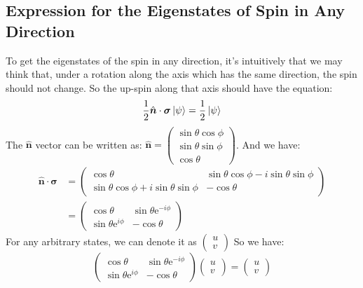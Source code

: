 \documentclass[../main.tex]{subfiles}
\begin{document}
\subsection{Expression for the Eigenstates of Spin in Any Direction}
To get the eigenstates of the spin in any direction, it's intuitively that we may think that, under a rotation along the
axis which has the same direction, the spin should not change. So the up-spin along that axis should have the equation:
\begin{equation}
    \frac{1}{2}\hat{\bm{n}}\cdot\bm{\sigma} \ket{\psi} = \frac{1}{2} \ket{\psi}
\end{equation}
The $\hat{\bm{n}}$ vector can be written as: $\hat{\bm{n}} = \begin{pmatrix}
    \sin\theta\cos\phi \\ \sin\theta\sin\phi\\ \cos\theta
\end{pmatrix}$. And we have:
\begin{align}
    \hat{\bm{n}}\cdot\bm{\sigma} &= \begin{pmatrix}
        \cos\theta & \sin\theta\cos\phi - i\sin\theta\sin\phi\\\sin\theta\cos\phi + i\sin\theta\sin\phi & -\cos\theta
    \end{pmatrix}\nonumber\\
    &= \begin{pmatrix}
        \cos\theta & \sin\theta \textrm{e}^{-i\phi}\\
        \sin\theta\textrm{e}^{i\phi} & -\cos\theta
    \end{pmatrix}
\end{align}
For any arbitrary states, we can denote it as $\begin{pmatrix}
    u\\v
\end{pmatrix}$
So we have:
\begin{equation}
    \begin{pmatrix}
        \cos\theta & \sin\theta \textrm{e}^{-i\phi}\\
        \sin\theta\textrm{e}^{i\phi} & -\cos\theta
    \end{pmatrix} \begin{pmatrix}
    u\\v
\end{pmatrix} = \begin{pmatrix}
    u\\v
\end{pmatrix}
\end{equation}
\end{document}
